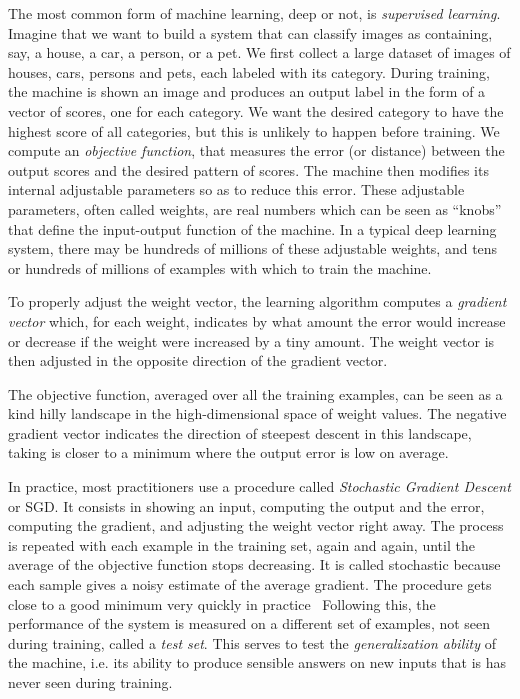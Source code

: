 \documentclass[10pts]{article}
\begin{document}
The most common form of machine learning, deep or not, is {\em
  supervised learning}. Imagine that we want to build a system that
can classify images as containing, say, a house, a car, a person, or a
pet. We first collect a large dataset of images of houses, cars,
persons and pets, each labeled with its category. During training, the
machine is shown an image and produces an output label in the form of
a vector of scores, one for each category. We want the desired
category to have the highest score of all categories, but this is
unlikely to happen before training.  We compute an {\em objective
  function}, that measures the error (or distance) between the output
scores and the desired pattern of scores. The machine then modifies
its internal adjustable parameters so as to reduce this error. These
adjustable parameters, often called weights, are real numbers which
can be seen as ``knobs'' that define the input-output function of the
machine. In a typical deep learning system, there may be hundreds of
millions of these adjustable weights, and tens or hundreds of millions
of examples with which to train the machine.

To properly adjust the weight vector, the learning algorithm computes
a {\em gradient vector} which, for each weight, indicates by what
amount the error would increase or decrease if the weight were
increased by a tiny amount. The weight vector is then adjusted in the
opposite direction of the gradient vector. 

The objective function, averaged over all the training examples, can
be seen as a kind hilly landscape in the high-dimensional space of
weight values. The negative gradient vector indicates the direction of
steepest descent in this landscape, taking is closer to a minimum
where the output error is low on average.

In practice, most practitioners use a procedure called {\em Stochastic
  Gradient Descent} or SGD. It consists in showing an input, computing
the output and the error, computing the gradient, and adjusting the
weight vector right away. The process is repeated with each example in
the training set, again and again, until the average of the objective
function stops decreasing. It is called stochastic because each sample
gives a noisy estimate of the average gradient. The procedure gets
close to a good minimum very quickly in
practice~\cite{bottou-bousquet-2008-small} Following this, the
performance of the system is measured on a different set of examples,
not seen during training, called a {\em test set}. This serves to test
the {\em generalization ability} of the machine, i.e. its ability to
produce sensible answers on new inputs that is has never seen during
training.
\end{document}
